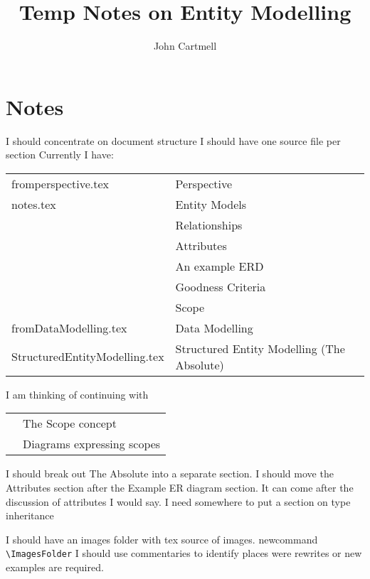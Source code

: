 \documentclass[10pt,a4paper]{article}
\title{Temp Notes on Entity Modelling}
\author{John Cartmell}
\begin{document}
\maketitle
\section{Notes}
\mynote I should concentrate on document structure
\mynote I should have one source file per section
Currently I have: \\
\begin{tabular}{l l}
fromperspective.tex & Perspective \\
notes.tex & Entity Models \\
	& Relationships \\
	& Attributes \\
	& An example ERD \\
	& Goodness Criteria \\
	& Scope \\
fromDataModelling.tex	& Data Modelling \\
StructuredEntityModelling.tex	& Structured Entity Modelling (The Absolute)\\
\end{tabular} 

\mynote I am thinking of continuing with \\
\begin{tabular}{l l}
&The Scope concept \\
&Diagrams expressing scopes
\end{tabular}

\mynote I should break out The Absolute into a separate section.
\mynote I should move the Attributes section after the Example ER diagram section.
It can come after the discussion of attributes I would say.
\mynote I need somewhere to put a section on type inheritance

\mynote I should have an images folder with tex source of images. newcommand \verb'\ImagesFolder'
\mynote I should use commentaries to identify places were rewrites or new examples are required.


 
 
 
 
 
 
 
 
 
 
\end{document}
